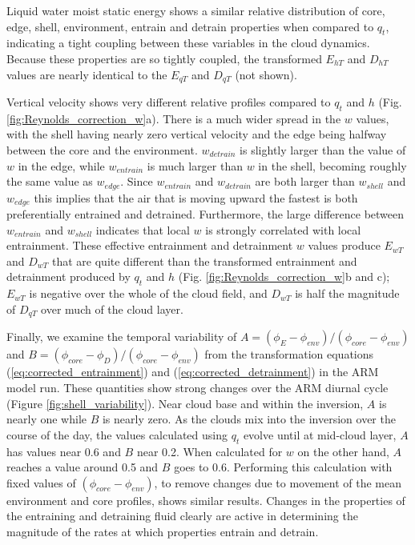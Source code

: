 \documentclass[12pt]{article}
\begin{document}
Liquid water moist static energy shows a similar relative distribution of 
core, edge, shell, environment, entrain and detrain properties when compared 
to $q_t$, indicating a tight coupling between these variables in the cloud
dynamics.  Because these properties are so tightly coupled, the transformed 
$E_{hT}$ and $D_{hT}$ values are nearly identical to the $E_{qT}$ and 
$D_{qT}$ (not shown).

Vertical velocity shows very different relative profiles compared to
$q_t$ and $h$ (Fig. \ref{fig:Reynolds_correction_w}a).  There is a much wider spread in the $w$ values, with the shell having nearly zero vertical velocity 
and the edge being halfway between the core and the environment.  $w_{detrain}$ 
is slightly larger than the value of $w$ in the edge, while $w_{entrain}$ is 
much larger than $w$ in the shell, becoming roughly the same value as 
$w_{edge}$.  Since $w_{entrain}$ and $w_{detrain}$ are both larger than 
$w_{shell}$ and $w_{edge}$ this implies that the air that is moving upward 
the fastest is both preferentially entrained and detrained.  Furthermore, 
the large difference between $w_{entrain}$ and $w_{shell}$ indicates that 
local $w$ is strongly correlated with local entrainment.  These effective
entrainment and detrainment $w$ values produce $E_{wT}$ and $D_{wT}$ that 
are quite different than the transformed entrainment and detrainment produced 
by $q_t$ and $h$ (Fig. \ref{fig:Reynolds_correction_w}b and c); 
$E_{wT}$ is negative over the whole of the cloud field, and $D_{wT}$ is half 
the magnitude of $D_{qT}$ over much of the cloud layer.

Finally, we examine the temporal variability of 
$A = (\phi_E - \phi_{env})/(\phi_{core} - \phi_{env})$ and
$B = (\phi_{core} - \phi_D)/(\phi_{core} - \phi_{env})$ from the transformation
equations (\ref{eq:corrected_entrainment}) and (\ref{eq:corrected_detrainment})
in the ARM model run.  These quantities show strong changes over the ARM diurnal
cycle (Figure \ref{fig:shell_variability}).  Near cloud base and within the
inversion, $A$ is nearly one while $B$ is nearly zero.  As the clouds mix 
into the inversion over the course of the day, the values calculated using 
$q_t$ evolve until at mid-cloud layer, $A$ has values near 0.6 and $B$ near 
0.2.  When calculated for $w$ on the other hand, $A$ reaches a value around 
0.5 and $B$ goes to 0.6.  Performing this calculation with fixed values of 
$(\phi_{core} - \phi_{env})$, to remove changes due to movement of the mean
environment and core profiles, shows similar results.  Changes in the 
properties of the entraining and detraining fluid clearly are active in
determining the magnitude of the rates at which properties entrain and detrain.
\end{document}
